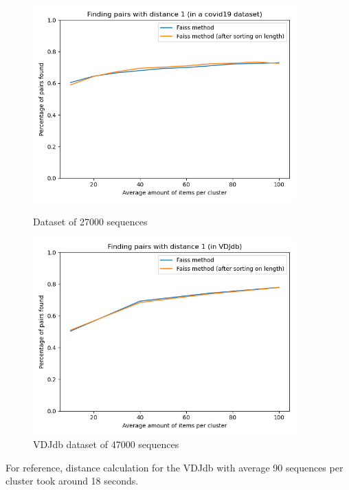 \documentclass[11pt]{article}
\begin{document}
    \begin{figure}[H]
        \centering
        \begin{minipage}{0.45\textwidth}
            \centering
            \includegraphics[width=0.9\textwidth]{img/pairs1_covid19.png}
            \caption{Dataset of 27000 sequences}
        \end{minipage}\hfill
        \begin{minipage}{0.45\textwidth}
            \centering
            \includegraphics[width=0.9\textwidth]{img/pairs1_vdj.png}
            \caption{VDJdb dataset of 47000 sequences}
        \end{minipage}
    \end{figure}

    For reference, distance calculation for the VDJdb with average 90 sequences per cluster took around 18 seconds.
\end{document}
